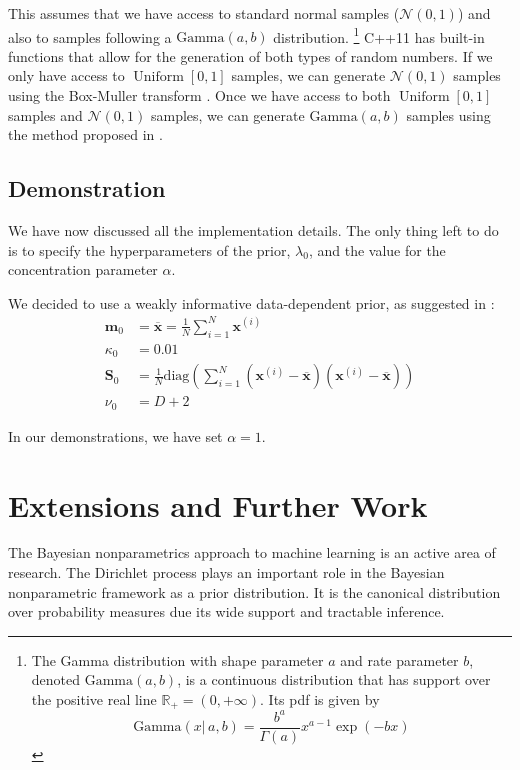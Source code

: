 \documentclass[final,3p,times,twocolumn]{elsarticle}
\DeclareMathOperator*{\Uniform}{Uniform}
\let\bs\boldsymbol
\let\ol\overline
\begin{document}
This assumes that we have access to standard normal samples ($\mathcal{N}(0,1)$) and also to samples following a $\mbox{Gamma}(a,b)$ distribution.
\footnote{The Gamma distribution with shape parameter $a$ and rate parameter $b$, denoted $\mbox{Gamma}(a,b)$, is a continuous distribution that has support over the positive real line $\mathbb{R}_+ = (0,+\infty)$.
Its pdf is given by
\[
\mbox{Gamma}(x|\,a,b) = \frac{b^a}{\Gamma\left(a\right)} x^{a-1} \exp \left(-bx\right)
\]
}
C++11 has built-in functions that allow for the generation of both types of random numbers.
If we only have access to $\Uniform[0,1]$ samples, we can generate $\mathcal{N}(0,1)$ samples using the Box-Muller transform \cite{box1958}.
Once we have access to both $\Uniform[0,1]$ samples and $\mathcal{N}(0,1)$ samples, we can generate $\mbox{Gamma}(a,b)$ samples using the method proposed in \cite{marsaglia2000}.

\subsection{Demonstration}
We have now discussed all the implementation details.
The only thing left to do is to specify the hyperparameters of the prior, $\lambda_0$, and the value for the concentration parameter $\alpha$.

We decided to use a weakly informative data-dependent prior, as suggested in \cite{Murphy}:
\begin{equation}
\begin{split}
\bs m_0 &= \ol{\bs x} = \frac{1}{N}\sum_{i=1}^N \bs x^{(i)}\\
\kappa_0 &= 0.01\\
\bs S_0 &= \frac{1}{N}\mbox{diag}\left(\sum_{i=1}^N\left(\bs x^{(i)} - \ol{\bs x}\right)\left(\bs x^{(i)} - \ol{\bs x}\right)\right)\\
\nu_0 &= D + 2
\end{split}
\end{equation}

In our demonstrations, we have set $\alpha = 1$. 

\section{Extensions and Further Work}
\label{sect:conclusion}
The Bayesian nonparametrics approach to machine learning is an active area of research.
The Dirichlet process plays an important role in the Bayesian nonparametric framework as a prior distribution.
It is the canonical distribution over probability measures due its wide support and tractable inference.
\end{document}
